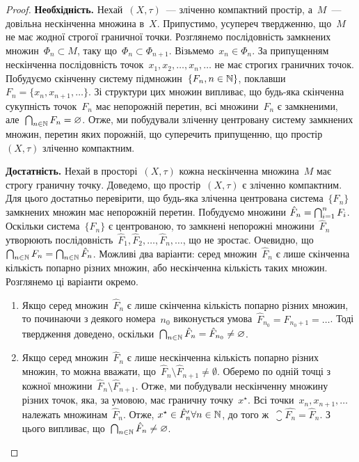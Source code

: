 \begin{proof}
    \textbf{Необхідність.} Нехай~$(X, \tau)$~--- зліченно компактний простір, а~$M$~--- довільна нескінченна множина в~$X$. Припустимо, усупереч твердженню, що~$M$ не має жодної строгої граничної точки. Розглянемо послідовність замкнених множин~$\Phi_n \subset M$, таку що~$\Phi_n \subset \Phi_{n + 1}$. Візьмемо~$x_n \in \Phi_n$. За припущенням нескінченна послідовність точок~$x_1, x_2, \dots, x_n, \dots$ не має строгих граничних точок. Побудуємо скінченну систему підмножин~$\{F_n, n \in \mathbb{N}\}$, поклавши~$F_n = \{x_n, x_{n+1}, \dots\}$. Зі структури цих множин випливає, що будь-яка скінченна сукупність точок~$F_n$ має непорожній перетин, всі множини~$F_n$ є замкненими, але~$\operatorname*{\bigcap}_{n \in \mathbb{N}} F_n = \varnothing$. Отже, ми побудували зліченну центровану систему замкнених множин, перетин яких порожній, що суперечить припущенню, що простір~$(X, \tau)$ зліченно компактним.

    \textbf{Достатність.} Нехай в просторі~$(X, \tau)$ кожна нескінченна множина~$M$ має строгу граничну точку. Доведемо, що простір~$(X, \tau)$ є зліченно компактним. Для цього достатньо перевірити, що будь-яка зліченна центрована система~$\{F_n\}$ замкнених множин має непорожній перетин. Побудуємо множини $\hat F_n = \operatorname*{\bigcap}_{i = 1}^n F_i$. Оскільки система~$\{F_n\}$ є центрованою, то замкнені непорожні множини~$\hat F_n$ утворюють послідовність~$\hat F_1, \hat F_2, \dots, \hat F_n, \dots$, що не зростає. Очевидно, що~$\operatorname*{\bigcap}_{n \in \mathbb{N}} F_n = \operatorname*{\bigcap}_{n \in \mathbb{N}} \hat F_n$. Можливі два варіанти: серед множин~$\hat F_n$ є лише скінченна кількість попарно різних множин, або нескінченна кількість таких множин. Розглянемо ці варіанти окремо.
    \begin{enumerate}
        \item Якщо серед множин~$\hat F_n$ є лише скінченна кількість попарно різних множин, то починаючи з деякого номера~$n_0$ виконується умова~$\hat F_{n_0} = \hat F_{n_0 + 1} = \dots$. Тоді твердження доведено, оскільки~$\operatorname*{\bigcap}_{n \in \mathbb{N}} \hat F_n = \hat F_{n_0} \ne \varnothing$.

        \item Якщо серед множин~$\hat F_n$ є лише нескінченна кількість попарно різних множин, то можна вважати, що~$\hat F_n \setminus \hat F_{n + 1} \ne \emptyset$. Оберемо по одній точці з кожної множини~$\hat F_n \setminus \hat F_{n + 1}$. Отже, ми побудували нескінченну множину різних точок, яка, за умовою, має граничну точку~$x^\star$. Всі точки~$x_n, x_{n + 1}, \dots$ належать множинам~$\hat F_n$. Отже, $x^\star \in \hat F_n' \forall n \in \mathbb{N}$, до того ж~$\closure{\hat{F_n}} = \hat F_n$. З цього випливає, що~$\operatorname*{\bigcap}_{n \in \mathbb{N}} \hat F_n \ne \varnothing$. \qedhere
    \end{enumerate}
\end{proof}


